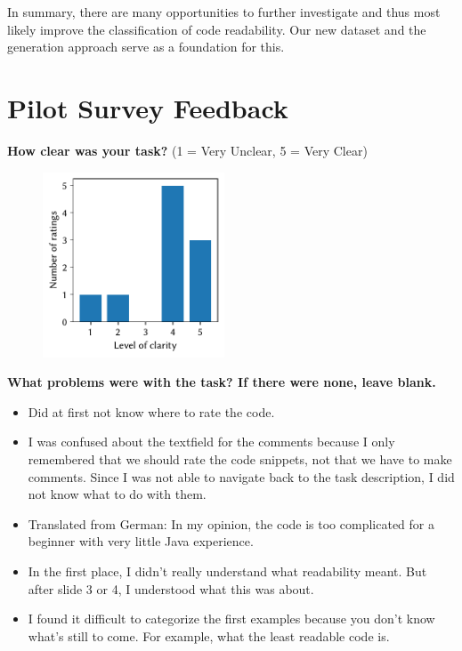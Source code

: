 \documentclass[%
class=scrreprt,
chapterprefix=false,%
open=right,%
twoside=true,%
paper=a4,%
logofile={Logo\_zentral\_farbig\_EN.png},%
thesistype=master,%
UKenglish,%
]{se2thesis}
\theoremstyle{definition}
\begin{document}
	In summary, there are many opportunities to further investigate and thus most likely improve the classification of code readability. Our new dataset and the generation approach serve as a foundation for this.
	
\authorshipDeclaration
	
\backmatter

\printbibliography	
	\appendix
	

\chapter{Pilot Survey Feedback}\label{appendix:pilot-survey-feedback}

	\textbf{How clear was your task?} (1 = Very Unclear, 5 = Very Clear)
	\begin{figure}[h!]
		\centering
		\includegraphics[width=0.48\textwidth]{img/pilot_survey_task_clearness.pdf}
		\label{fig:pilot-task-clear}
	\end{figure}
	
	\textbf{What problems were with the task? If there were none, leave blank.}
	\begin{itemize}
		\item Did at first not know where to rate the code.
		\item I was confused about the textfield for the comments because I only remembered that we should rate the code snippets, not that we have to make comments. Since I was not able to navigate back to the task description, I did not know what to do with them.
		\item Translated from German: In my opinion, the code is too complicated for a beginner with very little Java experience.
		\item In the first place, I didn't really understand what readability meant. But after slide 3 or 4, I understood what this was about.
		\item I found it difficult to categorize the first examples because you don't know what's still to come. For example, what the least readable code is.
	\end{itemize}
\end{document}
